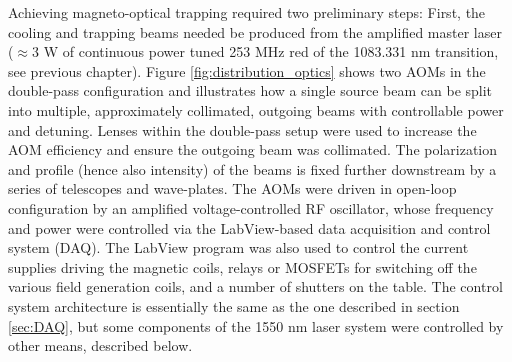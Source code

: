 	Achieving magneto-optical trapping required two preliminary steps: First, the cooling and trapping beams needed be produced from the amplified master laser ($\approx$3 W of continuous power tuned 253 MHz red of the 1083.331 nm transition, see previous chapter).
	Figure \ref{fig:distribution_optics} shows two AOMs in the double-pass configuration and illustrates how a single source beam can be split into multiple, approximately collimated, outgoing beams with controllable power and detuning.
	Lenses within the double-pass setup were used to increase the AOM efficiency and ensure the outgoing beam was collimated.
	The polarization and profile (hence also intensity) of the beams is fixed further downstream by a series of telescopes and wave-plates.
	The AOMs were driven in open-loop configuration by an amplified voltage-controlled RF oscillator, whose frequency and power were controlled via the LabView-based data acquisition and control system (DAQ).
	The LabView program was also used to control the current supplies driving the magnetic coils, relays or MOSFETs for switching off the various field generation coils, and a number of shutters on the table.
	The control system architecture is essentially the same as the one described in section \ref{sec:DAQ}, but some components of the 1550 nm laser system were controlled by other means, described below.
	
